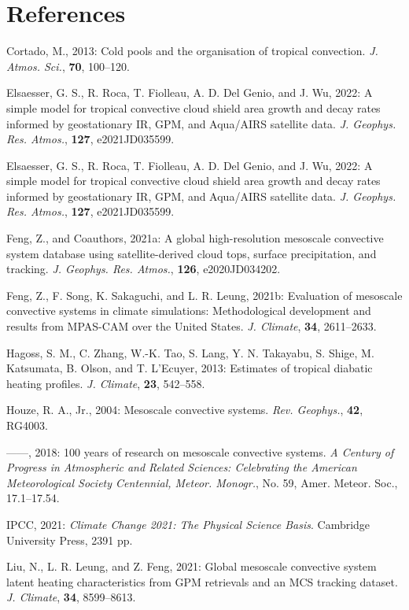 \documentclass[12pt]{article}
\begin{document}
\section*{References}
\begin{flushleft}
\setlength{\parindent}{-2em}\setlength{\leftskip}{2em}

Cortado, M., 2013: Cold pools and the organisation of tropical convection. \textit{J. Atmos. Sci.}, \textbf{70}, 100--120.

Elsaesser, G. S., R. Roca, T. Fiolleau, A. D. Del Genio, and J. Wu, 2022: A simple model for tropical convective cloud shield area growth and decay rates informed by geostationary IR, GPM, and Aqua/AIRS satellite data. \textit{J. Geophys. Res. Atmos.}, \textbf{127}, e2021JD035599.

Elsaesser, G. S., R. Roca, T. Fiolleau, A. D. Del Genio, and J. Wu, 2022: A simple model for tropical convective cloud shield area growth and decay rates informed by geostationary IR, GPM, and Aqua/AIRS satellite data. \textit{J. Geophys. Res. Atmos.}, \textbf{127}, e2021JD035599.

Feng, Z., and Coauthors, 2021a: A global high-resolution mesoscale convective system database using satellite-derived cloud tops, surface precipitation, and tracking. \textit{J. Geophys. Res. Atmos.}, \textbf{126}, e2020JD034202.

Feng, Z., F. Song, K. Sakaguchi, and L. R. Leung, 2021b: Evaluation of mesoscale convective systems in climate simulations: Methodological development and results from MPAS-CAM over the United States. \textit{J. Climate}, \textbf{34}, 2611--2633.

Hagoss, S. M., C. Zhang, W.-K. Tao, S. Lang, Y. N. Takayabu, S. Shige, M. Katsumata, B. Olson, and T. L'Ecuyer, 2013: Estimates of tropical diabatic heating profiles. \textit{J. Climate}, \textbf{23}, 542--558.

Houze, R. A., Jr., 2004: Mesoscale convective systems. \textit{Rev. Geophys.}, \textbf{42}, RG4003.

------, 2018: 100 years of research on mesoscale convective systems. \textit{A Century of Progress in Atmospheric and Related Sciences: Celebrating the American Meteorological Society Centennial, Meteor. Monogr.}, No. 59, Amer. Meteor. Soc., 17.1--17.54.

IPCC, 2021: \textit{Climate Change 2021: The Physical Science Basis}. Cambridge University Press, 2391 pp.

Liu, N., L. R. Leung, and Z. Feng, 2021: Global mesoscale convective system latent heating characteristics from GPM retrievals and an MCS tracking dataset. \textit{J. Climate}, \textbf{34}, 8599--8613.


\end{flushleft}
\end{document}
